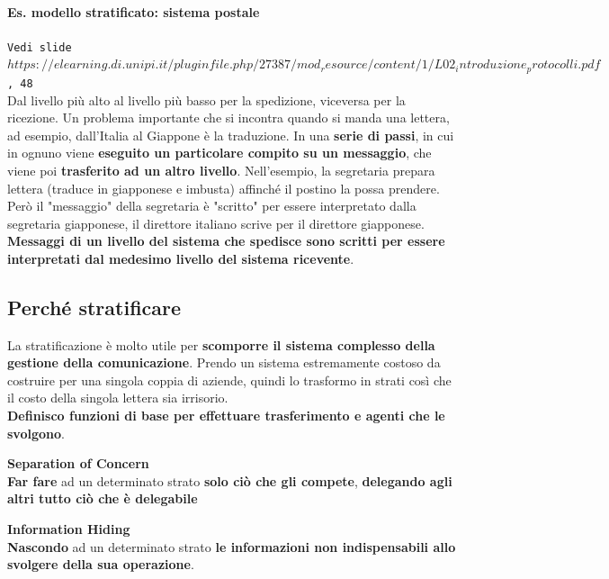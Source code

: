 \documentclass[10pt]{article}
\begin{document}
\paragraph{Es. modello stratificato: sistema postale}\texttt{Vedi slide\\$https://elearning.di.unipi.it/pluginfile.php/27387/mod_resource/content/1/L02_introduzione_protocolli.pdf$, 48}\\
Dal livello più alto al livello più basso per la spedizione, viceversa per la ricezione. Un problema importante che si incontra quando si manda una lettera, ad esempio, dall'Italia al Giappone è la traduzione. In una \textbf{serie di passi}, in cui in ognuno viene \textbf{eseguito un particolare compito su un messaggio}, che viene poi \textbf{trasferito ad un altro livello}. Nell'esempio, la segretaria prepara lettera (traduce in giapponese e imbusta) affinché il postino la possa prendere. Però il "messaggio" della segretaria è "scritto" per essere interpretato dalla segretaria giapponese, il direttore italiano scrive per il direttore giapponese. \textbf{Messaggi di un livello del sistema che spedisce sono scritti per essere interpretati dal medesimo livello del sistema ricevente}.
\subsection{Perché stratificare} La stratificazione è molto utile per \textbf{scomporre il sistema complesso della gestione della comunicazione}. Prendo un sistema estremamente costoso da costruire per una singola coppia di aziende, quindi lo trasformo in strati così che il costo della singola lettera sia irrisorio.\\
\textbf{Definisco funzioni di base per effettuare trasferimento e agenti che le svolgono}.
\begin{list}{}{Principi di base:}
\item \textbf{Separation of Concern}\\\textbf{Far fare} ad un determinato strato \textbf{solo ciò che gli compete}, \textbf{delegando agli altri tutto ciò che è delegabile}
\item \textbf{Information Hiding}\\\textbf{Nascondo} ad un determinato strato \textbf{le informazioni non indispensabili allo svolgere della sua operazione}.
\end{list}
\end{document}
